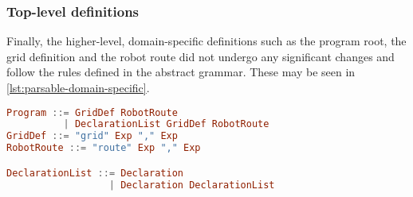 \subsubsection{Top-level definitions} %
Finally, the higher-level, domain-specific definitions such as the program root, the grid definition and the robot route did not undergo any significant changes and follow the rules defined in the abstract grammar. These may be seen in \cref{lst:parsable-domain-specific}.
\begin{lstlisting}[language=haskell, float=htb,
caption={Parsable production rules for program root, grid definition and robot route concepts},
label=lst:parsable-domain-specific]
Program ::= GridDef RobotRoute 
          | DeclarationList GridDef RobotRoute
GridDef ::= "grid" Exp "," Exp
RobotRoute ::= "route" Exp "," Exp

DeclarationList ::= Declaration 
                  | Declaration DeclarationList
\end{lstlisting}

